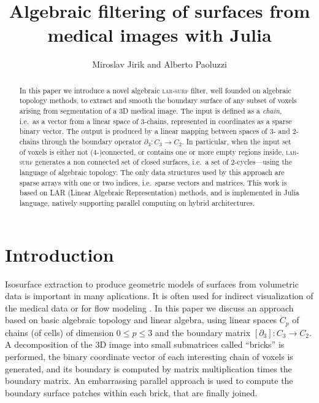 \documentclass[11pt, oneside]{amsart}   	%
\title{Algebraic filtering of surfaces from medical images with Julia}
\author{Miroslav Jirik and Alberto Paoluzzi}
\date{}							%
\begin{document}
\maketitle

\begin{abstract}
In this paper we introduce a novel algebraic \textsc{lar-surf} filter, well founded on algebraic topology methods, to extract and smooth the boundary surface of any subset of voxels arising from  segmentation of a 3D medical image. The input is defined as a \emph{chain}, i.e.~as a vector from a linear space of 3-chains, represented in coordinates as a sparse binary vector. The output is produced by a linear mapping between spaces of 3- and 2-chains through the boundary operator $\partial_3:C_3 \to C_2$.  In particular, when the input set of voxels is either not (4-)connected, or contains one or more empty regions inside, \textsc{lar-surf} generates a non connected set of closed surfaces, i.e.~a set of 2-cycles---using the language of algebraic topology. The only data structures used by this approach are sparse arrays with one or two indices, i.e.~sparse vectors and matrices. This work is based on LAR (Linear Algebraic Representation) methods, and is implemented in Julia language, natively supporting parallel computing on hybrid architectures.
\end{abstract}

\tableofcontents


%
\section{Introduction}\label{sec:intro}


Isosurface extraction to produce geometric models of surfaces from volumetric data is important in many aplications. It is often used for indirect visualization of the medical data or for flow modeling \cite{Rohan2018a}. 
In this paper we discuss an approach based on basic algebraic topology and linear algebra, using linear spaces $C_p$ of chains (of cells) of dimension $0 \leq p \leq 3$ and the boundary matrix $[\partial_3] : C_3 \to C_2$.
A decomposition of the 3D image into small submatrices called ``bricks'' is performed, the binary coordinate vector of each interesting chain of voxels is generated, and its boundary is computed by matrix multiplication times the boundary matrix. An embarrassing parallel approach is used to compute the boundary surface patches within each brick, that are finally joined.   
 
\end{document}
